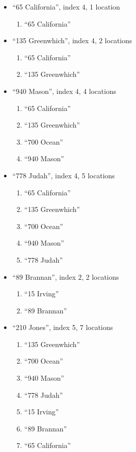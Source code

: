 \documentclass[10pt]{article}
\begin{document}
\begin{enumerate}
\begin{itemize}
				\item ``65 California'', index 4, 1 location
					\begin{enumerate}
						\item ``65 California''
					\end{enumerate}
					
				\item ``135 Greenwhich'', index 4, 2 locations
					\begin{enumerate}
						\item ``65 California''
						\item ``135 Greenwhich''
					\end{enumerate}
					
				\item ``940 Mason'', index 4, 4 locations
					\begin{enumerate}
						\item ``65 California''
						\item ``135 Greenwhich''
						\item ``700 Ocean''
						\item ``940 Mason''
					\end{enumerate}
				
				\item ``778 Judah'', index 4, 5 locations
					\begin{enumerate}
						\item ``65 California''
						\item ``135 Greenwhich''
						\item ``700 Ocean''
						\item ``940 Mason''
						\item ``778 Judah''
					\end{enumerate}
				
				\item ``89 Brannan'', index 2, 2 locations
					\begin{enumerate}
						\item ``15 Irving''
						\item ``89 Brannan''
					\end{enumerate}
				
				\item ``210 Jones'', index 5, 7 locations
					\begin{enumerate}
						\item ``135 Greenwhich''
						\item ``700 Ocean''
						\item ``940 Mason''
						\item ``778 Judah''
						\item ``15 Irving''
						\item ``89 Brannan''
						\item ``65 California''
					\end{enumerate}
			\end{itemize}
		

\end{enumerate}
\end{document}
